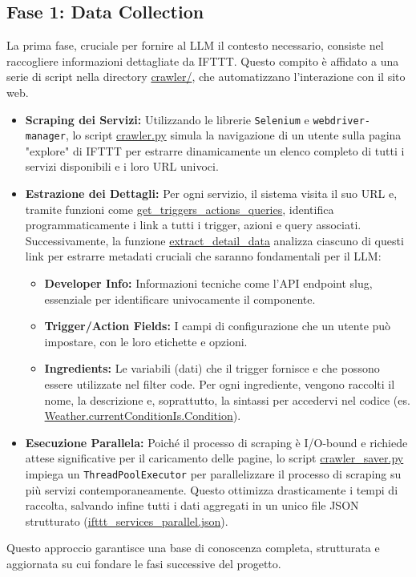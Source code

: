 \documentclass[sigconf,natbib=false]{acmart}
\begin{document}
\subsection{Fase 1: Data Collection}
La prima fase, cruciale per fornire al LLM il contesto necessario, consiste nel raccogliere informazioni dettagliate da IFTTT. Questo compito è affidato a una serie di script nella directory \url{crawler/}, che automatizzano l'interazione con il sito web.
\begin{itemize}
    \item \textbf{Scraping dei Servizi:} Utilizzando le librerie \texttt{Selenium} e \texttt{webdriver-manager}, lo script \url{crawler.py} simula la navigazione di un utente sulla pagina "explore" di IFTTT per estrarre dinamicamente un elenco completo di tutti i servizi disponibili e i loro URL univoci.
    \item \textbf{Estrazione dei Dettagli:} Per ogni servizio, il sistema visita il suo URL e, tramite funzioni come \url{get_triggers_actions_queries}, identifica programmaticamente i link a tutti i trigger, azioni e query associati. Successivamente, la funzione \url{extract_detail_data} analizza ciascuno di questi link per estrarre metadati cruciali che saranno fondamentali per il LLM:
    \begin{itemize}
        \item \textbf{Developer Info:} Informazioni tecniche come l'API endpoint slug, essenziale per identificare univocamente il componente.
        \item \textbf{Trigger/Action Fields:} I campi di configurazione che un utente può impostare, con le loro etichette e opzioni.
        \item \textbf{Ingredients:} Le variabili (dati) che il trigger fornisce e che possono essere utilizzate nel filter code. Per ogni ingrediente, vengono raccolti il nome, la descrizione e, soprattutto, la sintassi per accedervi nel codice (es. \url{Weather.currentConditionIs.Condition}).
    \end{itemize}
    \item \textbf{Esecuzione Parallela:} Poiché il processo di scraping è I/O-bound e richiede attese significative per il caricamento delle pagine, lo script \url{crawler_saver.py} impiega un \texttt{ThreadPoolExecutor} per parallelizzare il processo di scraping su più servizi contemporaneamente. Questo ottimizza drasticamente i tempi di raccolta, salvando infine tutti i dati aggregati in un unico file JSON strutturato (\url{ifttt_services_parallel.json}).
\end{itemize}
Questo approccio garantisce una base di conoscenza completa, strutturata e aggiornata su cui fondare le fasi successive del progetto.
\end{document}
